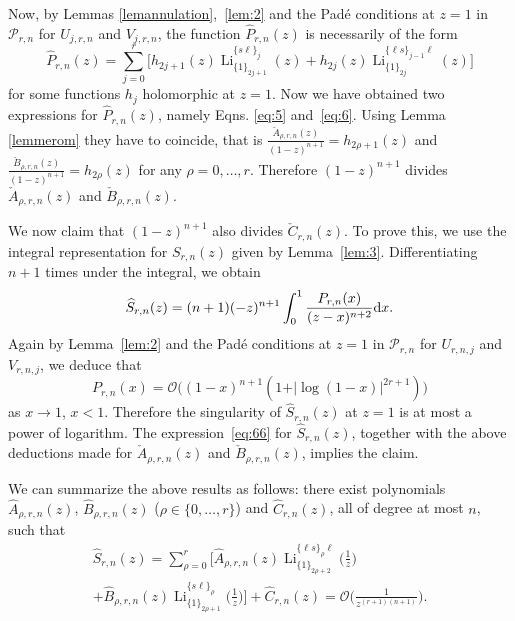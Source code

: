 \documentclass[reqno,12pt]{amsart}
\numberwithin{equation}{section}
\theoremstyle{remark}
\def\li{\operatorname{Li}}
\def\dd{\textup{d}}
\begin{document}
Now, by Lemmas \ref{lemannulation},~\ref{lem:2} and the Pad\'e conditions at $z=1$ in $\mathcal{P}_{r,n}$ 
for $U_{j,r,n}$ and $V_{j,r,n}$, the function $\widehat{P}_{r,n}(z)$ is necessarily of the form
\begin{equation}\label{eq:6}
\widehat{P}_{r,n}(z)=\sum_{j=0}^r \bigg[h_{2j+1}(z) \li_{\{1\}_{2j+1}}^{\{s\ell\}_j}(z)
+ h_{2j}(z) \li_{\{1\}_{2j}}^{\{\ell s\}_{j-1}\ell}(z)  \bigg]
\end{equation}
for some  functions $h_j$ holomorphic at $z=1$. Now we have obtained two expressions for 
$\widehat{P}_{r,n}(z)$, namely Eqns. \eqref{eq:5} and~\eqref{eq:6}. Using Lemma \ref{lemmerom} they have to coincide, that is  
$ \frac{\check{A}_{\rho,r,n}(z)}{(1-z)^{n+1}} = h_{2\rho+1}(z)$ and 
$\frac{\check{B}_{\rho,r,n}(z)}{(1-z)^{n+1}} =  h_{2\rho}(z)$ for any $\rho=0, \ldots, r$. Therefore $(1-z)^{n+1}$ 
divides $\check{A}_{\rho,r,n}(z)$ and $\check{B}_{\rho,r,n}(z)$.



We now claim that $(1-z)^{n+1}$ also divides $\check{C}_{r,n}(z)$. To prove  this, we use the integral 
representation for $S_{r,n}(z)$ given by Lemma~\ref{lem:3}.  Differentiating $n+1$ times under the integral, we obtain
$$
\widehat{S}_{r,n}(z)=(n+1)(-z)^{n+1}\int_0^1 \frac{P_{r,n}(x)}{(z-x)^{n+2}} \dd x.
$$
Again by Lemma~\ref{lem:2} and the Pad\'e conditions at $z=1$ in $\mathcal{P}_{r,n}$ 
for $U_{r,n,j}$ and $V_{r,n,j}$, we deduce that   
$$
P_{r,n}(x)=\mathcal{O}\big((1-x)^{n+1} (1+\vert \log(1-x)\vert^{2r+1})\big)
$$ 
as $x\to 1$, $x<1$.  Therefore 
the singularity of $\widehat{S}_{r,n}(z)$ at $z=1$  is  
at most a power of logarithm. 
The expression~\eqref{eq:66} for $\widehat{S}_{r,n}(z)$, together with 
the above deductions made for $\check{A}_{\rho,r,n}(z)$ and $\check{B}_{\rho,r,n}(z)$, implies the claim.

We can summarize the above results as follows:  there exist   polynomials $\widehat{A}_{\rho,r,n}(z)$,  
$\widehat{B}_{\rho,r,n}(z)$ ($\rho \in\{0, \ldots, r\}$) and $\widehat{C}_{r,n}(z)$, all of 
degree at most $n$, such that
\begin{multline}
\widehat{S}_{r,n}(z)
= \sum_{\rho=0}^r \bigg[\widehat{A}_{\rho,r,n}(z) \li_{\{1\}_{2\rho+2}}^{\{\ell s\}_\rho \ell}\bigg(\frac1z\bigg) 
\\
+\widehat{B}_{\rho,r,n}(z) \li_{\{1\}_{2\rho+1}}^{\{s\ell\}_\rho}\bigg(\frac1z\bigg)  \bigg] 
+ \widehat{C}_{r,n}(z) = \mathcal{O}\bigg(\frac{1}{z^{(r+1)(n+1)}}\bigg).\label{eq:7}
\end{multline}
\end{document}
